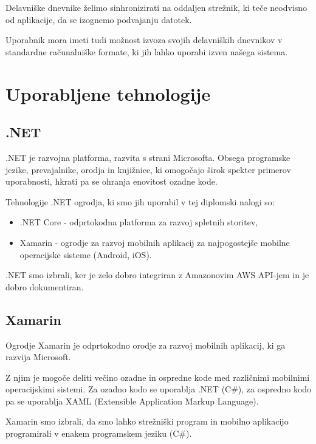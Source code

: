 \documentclass[a4paper, 12pt]{book}
\begin{document}
Delavniške dnevnike želimo sinhronizirati na oddaljen strežnik, ki teče neodvisno od aplikacije, da se izognemo podvajanju datotek.

Uporabnik mora imeti tudi možnost izvoza svojih delavniških dnevnikov v standardne računalniške formate, ki jih lahko uporabi izven našega sistema.


\section{Uporabljene tehnologije}

\subsection{.NET}

.NET \cite{dotnet} je razvojna platforma, razvita s strani Microsofta.
Obsega programske jezike, prevajalnike, orodja in knjižnice, ki omogočajo širok spekter primerov uporabnosti, hkrati pa se ohranja enovitost ozadne kode.

Tehnologije .NET ogrodja, ki smo jih uporabil v tej diplomski nalogi so:
\begin{itemize}
	\item .NET Core - odprtokodna platforma za razvoj spletnih storitev,
	\item Xamarin - ogrodje za razvoj mobilnih aplikacij za najpogostejše mobilne operacijske sisteme (Android, iOS).
\end{itemize}

.NET smo izbrali, ker je zelo dobro integriran z Amazonovim AWS API-jem in je dobro dokumentiran.

\subsection{Xamarin}

Ogrodje Xamarin \cite{xamarin} je odprtokodno orodje za razvoj mobilnih aplikacij, ki ga razvija Microsoft. 

Z njim je mogoče deliti večino ozadne in ospredne kode med različnimi mobilnimi operacijskimi sistemi. 
Za ozadno kodo se uporablja .NET (C\#), za ospredno kodo pa se uporablja XAML (Extensible Application Markup Language).

Xamarin smo izbrali, da smo lahko strežniški program in mobilno aplikacijo programirali v enakem programskem jeziku (C\#).
\end{document}
